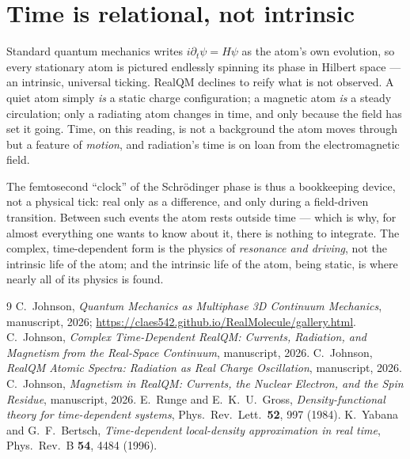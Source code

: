 \documentclass[11pt]{article}
\begin{document}
\section{Time is relational, not intrinsic}

Standard quantum mechanics writes $i\partial_t\psi=H\psi$ as the atom's own evolution, so every stationary
atom is pictured endlessly spinning its phase in Hilbert space --- an intrinsic, universal ticking. RealQM
declines to reify what is not observed. A quiet atom simply \emph{is} a static charge configuration; a
magnetic atom \emph{is} a steady circulation; only a radiating atom changes in time, and only because the
field has set it going. Time, on this reading, is not a background the atom moves through but a feature of
\emph{motion}, and radiation's time is on loan from the electromagnetic field.

The femtosecond ``clock'' of the Schr\"odinger phase is thus a bookkeeping device, not a physical tick: real
only as a difference, and only during a field-driven transition. Between such events the atom rests outside
time --- which is why, for almost everything one wants to know about it, there is nothing to integrate. The
complex, time-dependent form is the physics of \emph{resonance and driving}, not the intrinsic life of the
atom; and the intrinsic life of the atom, being static, is where nearly all of its physics is found.

\begin{thebibliography}{9}
 C.~Johnson, \emph{Quantum Mechanics as Multiphase 3D Continuum Mechanics}, manuscript,
2026; \url{https://claes542.github.io/RealMolecule/gallery.html}.
 C.~Johnson, \emph{Complex Time-Dependent RealQM: Currents, Radiation, and Magnetism
from the Real-Space Continuum}, manuscript, 2026.
 C.~Johnson, \emph{RealQM Atomic Spectra: Radiation as Real Charge Oscillation}, manuscript,
2026.
 C.~Johnson, \emph{Magnetism in RealQM: Currents, the Nuclear Electron, and the Spin
Residue}, manuscript, 2026.
 E.~Runge and E.~K.~U.~Gross, \emph{Density-functional theory for time-dependent
systems}, Phys.\ Rev.\ Lett.\ \textbf{52}, 997 (1984).
 K.~Yabana and G.~F.~Bertsch, \emph{Time-dependent local-density approximation in
real time}, Phys.\ Rev.\ B \textbf{54}, 4484 (1996).
\end{thebibliography}
\end{document}
